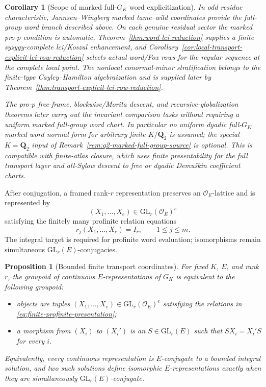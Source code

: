 \documentclass[11pt]{article}
\newtheorem{proposition}[theorem]{Proposition}
\newtheorem{corollary}[theorem]{Corollary}
\theoremstyle{definition}
\begin{document}
\begin{corollary}[Scope of marked full-$G_K$ word explicitization]\label{cor:q2-revised-full-gk-boundary}
In odd residue characteristic, Jannsen--Wingberg marked tame--wild coordinates
provide the full-group word branch described above.  On each genuine residual
sector the marked pro-$p$ condition is automatic, Theorem~\ref{thm:word-lci-reduction}
supplies a finite syzygy-complete lci/Koszul enhancement, and
Corollary~\ref{cor:local-transport-explicit-lci-row-reduction} selects actual
word/Fox rows for the regular sequence at the complete local point.  The
nonlocal conormal-minor stratification belongs to the finite-type
Cayley--Hamilton algebraization and is supplied later by
Theorem~\ref{thm:transport-explicit-lci-row-reduction}.

The pro-$p$ free-frame, blockwise/Morita descent, and recursive-globalization
theorems later carry out the invariant comparison tasks without requiring a
uniform marked full-group word chart.  In particular no uniform dyadic full-$G_K$ marked word normal form for
arbitrary finite $K/\mathbf Q_2$ is assumed; the special
$K=\mathbf Q_2$ input of Remark~\ref{rem:q2-marked-full-group-source}
is optional.  This is compatible with finite-atlas
closure, which uses finite presentability for the full transport layer and
all-Sylow descent to free or dyadic Demu\v{s}kin coefficient charts.
\end{corollary}

After conjugation, a framed rank-$r$ representation preserves an $\mathcal O_E$-lattice and is represented by
\[
(X_1,\ldots,X_e)\in \mathrm{GL}_r(\mathcal O_E)^e
\]
satisfying the finitely many profinite relation equations
\[
r_j(X_1,\ldots,X_e)=I_r,
\qquad 1\leq j\leq m.
\]
The integral target is required for profinite word evaluation; isomorphisms remain simultaneous $\mathrm{GL}_r(E)$-conjugacies.

\begin{proposition}[Bounded finite transport coordinates]\label{prop:finite-transport-coordinates}
For fixed $K$, $E$, and rank $r$, the groupoid of continuous $E$-representations of $G_K$ is equivalent to the following groupoid:
\begin{itemize}
\item objects are tuples $(X_1,\ldots,X_e)\in\mathrm{GL}_r(\mathcal O_E)^e$ satisfying the relations in \eqref{eq:finite-profinite-presentation};
\item a morphism from $(X_i)$ to $(X_i')$ is an $S\in\mathrm{GL}_r(E)$ such that $SX_i=X_i'S$ for every $i$.
\end{itemize}
Equivalently, every continuous representation is $E$-conjugate to a bounded integral solution, and two such solutions define isomorphic $E$-representations exactly when they are simultaneously $\mathrm{GL}_r(E)$-conjugate.
\end{proposition}
\end{document}
